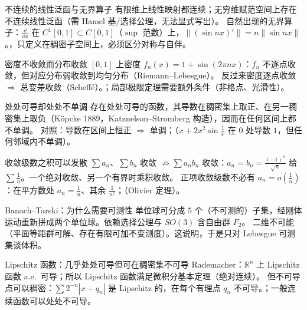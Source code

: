 \begin{结论}{不连续的线性泛函与无界算子}
有限维上线性映射都连续；无穷维赋范空间上存在不连续线性泛函（需 Hamel 基/选择公理，无法显式写出）。
自然出现的无界算子：$\frac{\dd}{\dd x}$ 在 $C^1[0,1]\subset C[0,1]$（$\sup$ 范数）上，$\|(\sin nx)'\|=n\|\sin nx\|$。，只定义在稠密子空间上，必须区分对称与自伴。
\end{结论}

\begin{结论}{密度不收敛而分布收敛}
$[0,1]$ 上密度 $f_n(x)=1+\sin(2\pi nx)$：$f_n$ 不逐点收敛，但对应分布弱收敛到均匀分布（Riemann--Lebesgue）。
反过来密度逐点收敛 $\Rightarrow$ 总变差收敛（Scheffé）。；局部极限定理需要额外条件（非格点、光滑性）。
\end{结论}

\begin{结论}{处处可导却处处不单调}
存在处处可导的函数，其导数在稠密集上取正、在另一稠密集上取负（Köpcke 1889，Katznelson--Stromberg 构造），因而在任何区间上都不单调。
对照：导数在区间上恒正 $\Rightarrow$ 单调；（$x+2x^2\sin\frac1x$ 在 $0$ 处导数 $1$，但任何邻域内不单调）。
\end{结论}

\begin{结论}{收敛级数之积可以发散}
$\sum a_n$、$\sum b_n$ 收敛 $\not\Rightarrow\sum a_nb_n$ 收敛：$a_n=b_n=\frac{(-1)^n}{\sqrt n}$ 给 $\sum\frac1n$。一个绝对收敛、另一个有界时乘积收敛。
正项收敛级数不必有 $a_n=o(\frac1n)$：在平方数处 $a_n=\frac1n$、其余 $\frac1{n^2}$；（Olivier 定理）。
\end{结论}

\begin{结论}{Banach--Tarski：为什么需要可测性}
单位球可分成 $5$ 个（不可测的）子集，经刚体运动重新拼成两个单位球。依赖选择公理与 $SO(3)$ 含自由群 $F_2$。
二维不可能（平面等距群可解、存在有限可加不变测度）。这说明，于是只对 Lebesgue 可测集谈体积。
\end{结论}

\begin{结论}{Lipschitz 函数：几乎处处可导但可在稠密集不可导}
Rademacher：$\mathbb R^n$ 上 Lipschitz 函数 a.e.\ 可导；所以 Lipschitz 函数满足微积分基本定理（绝对连续）。
但不可导点可以稠密：$\sum2^{-n}|x-q_n|$ 是 Lipschitz 的，在每个有理点 $q_n$ 不可导。；一般连续函数可以处处不可导。
\end{结论}

